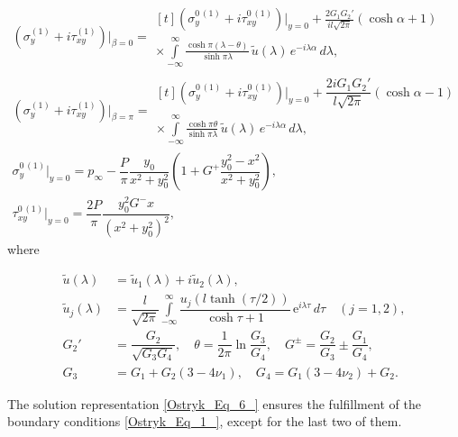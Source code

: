 \begin{equation} \label{Ostryk_Eq_6_}
\begin{array}{l}
	\left(\sigma_y^{(1)} + i\tau_{xy}^{(1)} \right)\Big|_{\beta = 0} 
	= \begin{multlined}[t]	
		\left(\sigma_y^{0\,(1)} + i\tau_{xy}^{0\,(1)} \right)\Big|_{y=0} 
		+ \frac{2G_1 G_2'}{i l \sqrt{2\pi}} (\cosh \alpha + 1)
		\\[-1em]
		\times \int\limits_{-\infty}^{\infty} 
		\frac{\cosh \pi (\lambda - \theta)}{\sinh \pi \lambda} \,
		\tilde{u}(\lambda) \, e^{-i\lambda \alpha} \, d\lambda,
	\end{multlined}
	\\
	\left(\sigma_y^{(1)} + i\tau_{xy}^{(1)} \right)\Big|_{\beta = \pi} 
	= \begin{multlined}[t]
		\left(\sigma_y^{0\,(1)} + i\tau_{xy}^{0\,(1)} \right)\Big|_{y=0} 
		+ \dfrac{2i G_1 G_2'}{l \sqrt{2\pi}} (\cosh \alpha - 1)
		\\[-1em]
		\times \int\limits_{-\infty}^{\infty} 
		\frac{\cosh \pi \theta}{\sinh \pi \lambda} \,
		\tilde{u}(\lambda) \, e^{-i\lambda \alpha} \, d\lambda,
	\end{multlined}
	\\[1ex]
	\sigma_y^{0\,(1)}\Big|_{y=0} = p_\infty 
	- \dfrac{P}{\pi} \dfrac{y_0}{x^2 + y_0^2} 
	\left(1 + G^+ \dfrac{y_0^2 - x^2}{x^2 + y_0^2} \right), 
	\\[0.5ex]
	\tau_{xy}^{0\,(1)}\Big|_{y=0} = \dfrac{2P}{\pi} \dfrac{y_0^2 G^- x}{(x^2 + y_0^2)^2},
\end{array}
\end{equation}
where

\[
\begin{aligned}
\tilde{u}(\lambda) &= \tilde{u}_1(\lambda) + i \tilde{u}_2(\lambda), 
\\
\tilde{u}_j(\lambda) &= 
\dfrac{l}{\sqrt{2\pi}}\displaystyle \int\limits_{-\infty}^{\infty} 
\dfrac{u_j(l \tanh (\tau / 2))}{\cosh \tau + 1} \,
\mathrm{e}^{i \lambda \tau} \, d\tau \quad (j = 1, 2),
\\
G_2' &= \dfrac{G_2}{\sqrt{G_3 G_4}}, \quad 
\theta = \dfrac{1}{2\pi} \ln \dfrac{G_3}{G_4},\quad
G^{\pm} = \dfrac{G_2}{G_3} \pm \dfrac{G_1}{G_4},
\\
G_3 &= G_1 + G_2 (3 - 4\nu_1), \quad 
G_4 = G_1 (3 - 4\nu_2) + G_2.
\end{aligned}
\]

The solution representation \eqref{Ostryk_Eq_6_} ensures the fulfillment of the boundary conditions \eqref{Ostryk_Eq_1_}, except for the last two of them.

